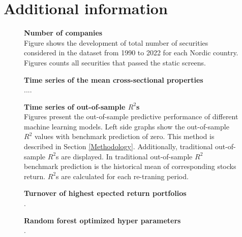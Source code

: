 \documentclass{article}
\begin{document}
\clearpage

\section{Additional information}
\renewcommand{\thefigure}{C.\arabic{figure}}
\setcounter{figure}{0}
\renewcommand{\thetable}{C.\arabic{table}}
\setcounter{table}{0}

\begin{figure}[ht]
\centering
\caption[Number of companies]{\textbf{Number of companies}\\ Figure shows the development of total number of securities considered in the dataset from 1990 to 2022 for each Nordic country. Figures counts all securities that passed the static screens.}

\label{plot:number_of_companies}
\end{figure}

\begin{figure}[ht]
\centering
\caption[Time series of the mean cross-sectional properties]{\textbf{Time series of the mean cross-sectional properties}\\ ....}

\label{plot:variableTS}
\end{figure}

\begin{figure}[ht]
\centering
\caption[Time series of out-of-sample $R^2$]{\textbf{Time series of out-of-sample \boldmath$R^2$s}\\ Figures present the out-of-sample predictive performance of different machine learning models. Left side graphs show the out-of-sample $R^2$ values with benchmark prediction of zero. This method is described in Section \ref{Methodology}. Additionally, traditional out-of-sample $R^2$s are displayed. In traditional out-of-sample $R^2$ benchmark prediction is the historical mean of corresponding stocks return. $R^2$s are calculated for each re-traning period.}

\label{plot:OOSR2_ts}
\end{figure}

\begin{figure}[ht]
\centering
\caption[Turnover of highest epected return portfolios]{\textbf{Turnover of highest epected return portfolios}\\ .}

\label{plot:Turnover}
\end{figure}

\begin{figure}[ht]
\centering
\caption[Optimized random forest hyperparameters]{\textbf{Random forest optimized hyper parameters}\\ .}

\label{plot:RFHyperParams}
\end{figure}

\clearpage


\end{document}
